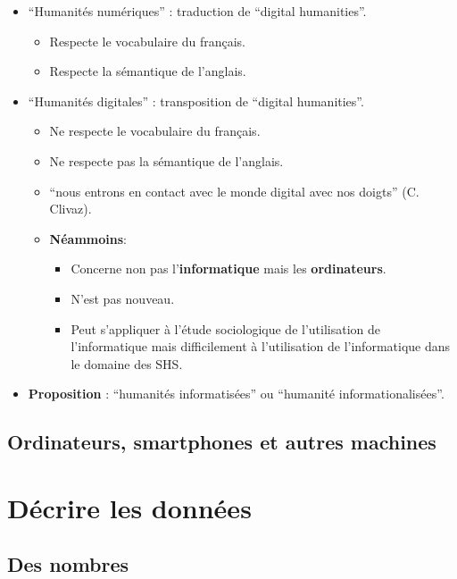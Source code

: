 \documentclass{beamer}
\newcommand{\forme}[1]{\enquote{#1}}
\begin{document}
\begin{frame}
	\begin{itemize}
		\item \forme{Humanités numériques} : traduction de \forme{digital humanities}.
		\begin{itemize}
			\item Respecte le vocabulaire du français.
			\item Respecte la sémantique de l'anglais.
		\end{itemize}
		
		\item \forme{Humanités digitales} : transposition de \forme{digital humanities}.
			\begin{itemize}
				\item Ne respecte le vocabulaire du français.
				\item Ne respecte pas la sémantique de l'anglais.
				\item {} \enquote{nous entrons en contact avec le monde digital avec nos doigts} (C. Clivaz). %
				\item \textbf{Néammoins}:
				\begin{itemize}
					\item Concerne non pas l'\textbf{informatique} mais les \textbf{ordinateurs}.
					\item N'est pas nouveau.
					\item Peut s'appliquer à l'étude sociologique de l'utilisation de l'informatique mais difficilement à l'utilisation de l'informatique dans le domaine des SHS.
				\end{itemize}
			\end{itemize}
		\item \textbf{Proposition} : \forme{humanités informatisées} ou \forme{humanité informationalisées}.
	\end{itemize}
\end{frame}
\subsection{Ordinateurs, smartphones et autres machines}

\section{Décrire les données}
\subsection{Des nombres}
\end{document}
